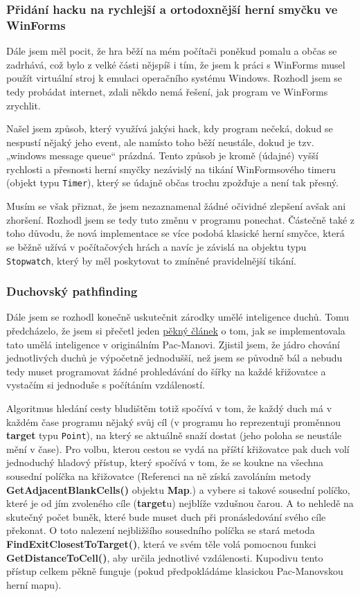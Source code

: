 \documentclass[a4]{article}
\begin{document}
\subsubsection{Přidání hacku na rychlejší a ortodoxnější herní smyčku ve WinForms} \label{gameloophack}
Dále jsem měl pocit, že hra běží na mém počítači poněkud pomalu a občas se zadrhává, což bylo z velké části nějspíš i tím, že jsem k práci s WinForms musel použít virtuální stroj k emulaci operačního systému Windows. Rozhodl jsem se tedy probádat internet, zdali někdo nemá řešení, jak program ve WinForms zrychlit. 

Našel jsem způsob, který využívá jakýsi hack, kdy program nečeká, dokud se nespustí nějaký jeho event, ale namísto toho běží neustále, dokud je tzv. „windows message queue“ prázdná. Tento způsob je kromě (údajné) vyšší rychlosti a přesnosti herní smyčky nezávislý na tikání WinFormsového timeru (objekt typu \verb|Timer|), který se údajně občas trochu zpožďuje a není tak přesný. 

Musím se však přiznat, že jsem nezaznamenal žádné očividné zlepšení avšak ani zhoršení. Rozhodl jsem se tedy tuto změnu v programu ponechat. Částečně také z toho důvodu, že nová implementace se více podobá klasické herní smyčce, která se běžně užívá v počítačových hrách a navíc je závislá na objektu typu \verb|Stopwatch|, který by měl poskytovat to zmíněné pravidelnější tikání.
\subsubsection{Duchovský pathfinding} \label{ghostpathfinding}
Dále jsem se rozhodl konečně uskutečnit zárodky umělé inteligence duchů. Tomu předcházelo, že jsem si přečetl jeden \href{https://www.gamedeveloper.com/design/the-pac-man-dossier}{pěkný článek} o tom, jak se implementovala tato umělá inteligence v originálním Pac-Manovi. Zjistil jsem, že jádro chování jednotlivých duchů je výpočetně jednodušší, než jsem se původně bál a nebudu tedy muset programovat žádné prohledávání do šířky na každé křižovatce a vystačím si jednoduše s počítáním vzdáleností. 

Algoritmus hledání cesty bludištěm totiž spočívá v tom, že každý duch má v každém čase programu nějaký svůj cíl (v programu ho reprezentuji proměnnou \textbf{target} typu \verb|Point|), na který se aktuálně snaží dostat (jeho poloha se neustále mění v čase). Pro volbu, kterou cestou se vydá na příští křižovatce pak duch volí jednoduchý hladový přístup, který spočívá v tom, že se koukne na všechna sousední políčka na křižovatce (Referenci na ně získá zavoláním metody \textbf{GetAdjacentBlankCells()} objektu \textbf{Map}.) a vybere si takové sousední políčko, které je od jím zvoleného cíle (\textbf{target}u) nejblíže vzdušnou čarou. A to nehledě na skutečný počet buněk, které bude muset duch při pronásledování svého cíle překonat. O toto nalezení nejbližšího sousedního políčka se stará metoda \textbf{FindExitClosestToTarget()}, která ve svém těle volá pomocnou funkci \textbf{GetDistanceToCell()}, aby určila jednotlivé vzdálenosti. Kupodivu tento přístup celkem pěkně funguje (pokud předpokládáme klasickou Pac-Manovskou herní mapu).
\end{document}
